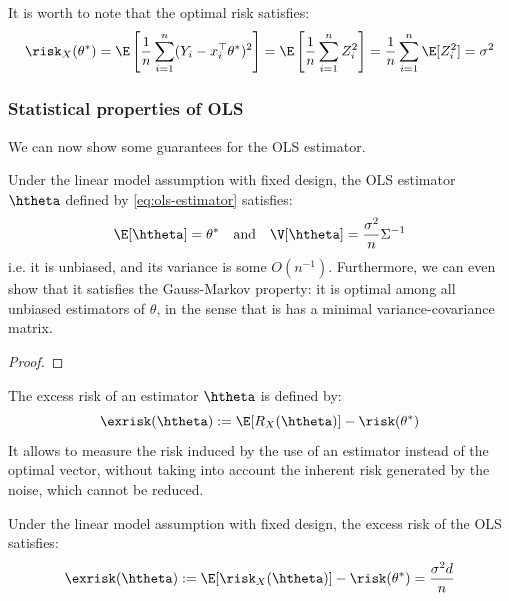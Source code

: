 \documentclass[toc, titlepaged]{../cs-classes/cs-classes}
\begin{document}
\begin{remark}
    It is worth to note that the optimal risk satisfies:
    \begin{equation*}
        \risk_X(\theta^*) = \E\left[\frac{1}{n}\sum_{i=1}^n(Y_i-x_i^\top\theta^*)^2\right] = \E\left[\frac{1}{n}\sum_{i=1}^nZ_i^2\right] = \frac{1}{n}\sum_{i=1}^n\E[Z_i^2]=\sigma^2
    \end{equation*}
\end{remark}

\subsubsection{Statistical properties of OLS}
We can now show some guarantees for the OLS estimator.

\begin{property}
    Under the linear model assumption with fixed design, the OLS estimator $\htheta$ defined by \eqref{eq:ols-estimator} satisfies:
    \begin{equation*}
        \E[\htheta] = \theta^* \quad \textnormal{and} \quad \V[\htheta] = \frac{\sigma^2}{n}\Sigma^{-1}
    \end{equation*}
    i.e. it is unbiased, and its variance is some $O(n^{-1})$. Furthermore, we can even show that it satisfies the Gauss-Markov property: it is optimal among all unbiased estimators of $\theta$, in the sense that is has a minimal variance-covariance matrix.
\end{property}

\begin{proof}
\end{proof}

\begin{definition}
    The excess risk of an estimator $\htheta$ is defined by:
    \begin{equation}
        \label{eq:excess-risk}
        \exrisk(\htheta) := \E[R_X(\htheta)]-\risk(\theta^*)
    \end{equation}
    It allows to measure the risk induced by the use of an estimator instead of the optimal vector, without taking into account the inherent risk generated by the noise, which cannot be reduced.
\end{definition}

\begin{corollary}
    Under the linear model assumption with fixed design, the excess risk of the OLS satisfies:
    \begin{equation*}
        \exrisk(\htheta) := \E[\risk_X(\htheta)]-\risk(\theta^*)=\frac{\sigma^2d}{n}
    \end{equation*}
\end{corollary}
\end{document}
